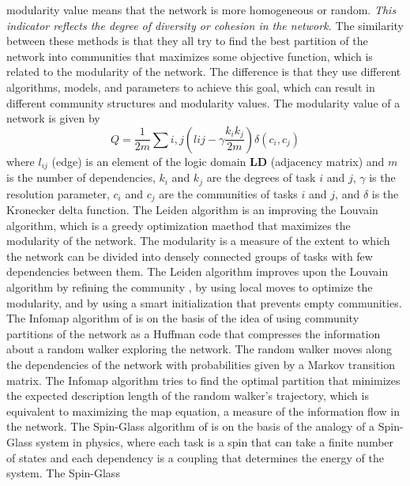 \documentclass[preprint,
3p]{elsarticle} %
\begin{document}
\begin{appendices}
\begin{itemize}
  modularity value means that the network is more homogeneous or random.
  \emph{This indicator reflects the degree of diversity or cohesion in
  the network.} The similarity between these methods is that they all
  try to find the best partition of the network into communities that
  maximizes some objective function, which is related to the modularity
  of the network. The difference is that they use different algorithms,
  models, and parameters to achieve this goal, which can result in
  different community structures and modularity values. The modularity
  value of a network is given by \begin{equation}
  Q = \frac {1} {2m} \sum {i,j} \left ( l{ij} - \gamma \frac {k_i k_j} {2m} \right ) \delta (c_i, c_j)\label{eq:mod}
  \end{equation} \noindent where \(l_{ij}\) (edge) is an element of the
  logic domain \(\mathbf{LD}\) (adjacency matrix) and \(m\) is the
  number of dependencies, \(k_i\) and \(k_j\) are the degrees of task
  \(i\) and \(j\), \(\gamma\) is the resolution parameter, \(c_i\) and
  \(c_j\) are the communities of tasks \(i\) and \(j\), and \(\delta\)
  is the Kronecker delta function. The Leiden algorithm is an improving
  the Louvain algorithm, which is a greedy optimization maethod that
  maximizes the modularity of the network. The modularity is a measure
  of the extent to which the network can be divided into densely
  connected groups of tasks with few dependencies between them. The
  Leiden algorithm improves upon the Louvain algorithm by refining the
  community \citep{Leiden2019}, by using local moves to optimize the
  modularity, and by using a smart initialization that prevents empty
  communities. The Infomap algorithm of \citet{rosvall2008maps} is on
  the basis of the idea of using community partitions of the network as
  a Huffman code that compresses the information about a random walker
  exploring the network. The random walker moves along the dependencies
  of the network with probabilities given by a Markov transition matrix.
  The Infomap algorithm tries to find the optimal partition that
  minimizes the expected description length of the random walker's
  trajectory, which is equivalent to maximizing the map equation, a
  measure of the information flow in the network. The Spin-Glass
  algorithm of \citet{reichardt2006networks} is on the basis of the
  analogy of a Spin-Glass system in physics, where each task is a spin
  that can take a finite number of states and each dependency is a
  coupling that determines the energy of the system. The Spin-Glass

\end{itemize}
\end{appendices}
\end{document}
